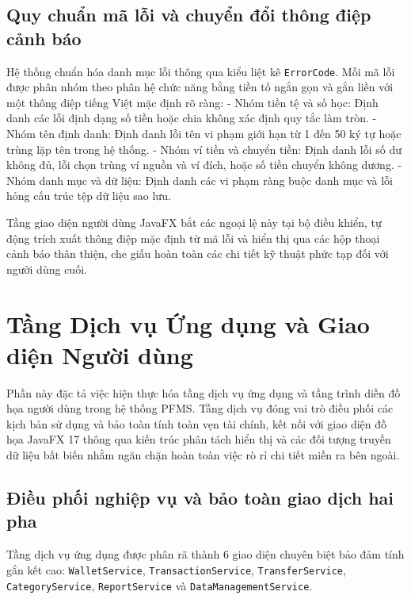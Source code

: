 \documentclass[a4paper,12pt]{report}
\newcommand{\passthrough}[1]{#1}
\begin{document}
\section{Quy chuẩn mã lỗi và chuyển đổi thông điệp cảnh
báo}\label{quy-chuux1ea9n-muxe3-lux1ed7i-vuxe0-chuyux1ec3n-ux111ux1ed5i-thuxf4ng-ux111iux1ec7p-cux1ea3nh-buxe1o}

Hệ thống chuẩn hóa danh mục lỗi thông qua kiểu liệt kê
\passthrough{\lstinline!ErrorCode!}. Mỗi mã lỗi được phân nhóm theo phân
hệ chức năng bằng tiền tố ngắn gọn và gắn liền với một thông điệp tiếng
Việt mặc định rõ ràng: - Nhóm tiền tệ và số học: Định danh các lỗi định
dạng số tiền hoặc chia không xác định quy tắc làm tròn. - Nhóm tên định
danh: Định danh lỗi tên vi phạm giới hạn từ 1 đến 50 ký tự hoặc trùng
lặp tên trong hệ thống. - Nhóm ví tiền và chuyển tiền: Định danh lỗi số
dư không đủ, lỗi chọn trùng ví nguồn và ví đích, hoặc số tiền chuyển
không dương. - Nhóm danh mục và dữ liệu: Định danh các vi phạm ràng buộc
danh mục và lỗi hỏng cấu trúc tệp dữ liệu sao lưu.

Tầng giao diện người dùng JavaFX bắt các ngoại lệ này tại bộ điều khiển,
tự động trích xuất thông điệp mặc định từ mã lỗi và hiển thị qua các hộp
thoại cảnh báo thân thiện, che giấu hoàn toàn các chi tiết kỹ thuật phức
tạp đối với người dùng cuối.

\chapter{Tầng Dịch vụ Ứng dụng và Giao diện Người
dùng}\label{tux1ea7ng-dux1ecbch-vux1ee5-ux1ee9ng-dux1ee5ng-vuxe0-giao-diux1ec7n-ngux1b0ux1eddi-duxf9ng}

Phần này đặc tả việc hiện thực hóa tầng dịch vụ ứng dụng và tầng trình
diễn đồ họa người dùng trong hệ thống PFMS. Tầng dịch vụ đóng vai trò
điều phối các kịch bản sử dụng và bảo toàn tính toàn vẹn tài chính, kết
nối với giao diện đồ họa JavaFX 17 thông qua kiến trúc phân tách hiển
thị và các đối tượng truyền dữ liệu bất biến nhằm ngăn chặn hoàn toàn
việc rò rỉ chi tiết miền ra bên ngoài.

\section{Điều phối nghiệp vụ và bảo toàn giao dịch hai
pha}\label{ux111iux1ec1u-phux1ed1i-nghiux1ec7p-vux1ee5-vuxe0-bux1ea3o-touxe0n-giao-dux1ecbch-hai-pha}

Tầng dịch vụ ứng dụng được phân rã thành 6 giao diện chuyên biệt bảo đảm
tính gắn kết cao: \passthrough{\lstinline!WalletService!},
\passthrough{\lstinline!TransactionService!},
\passthrough{\lstinline!TransferService!},
\passthrough{\lstinline!CategoryService!},
\passthrough{\lstinline!ReportService!} và
\passthrough{\lstinline!DataManagementService!}.
\end{document}

